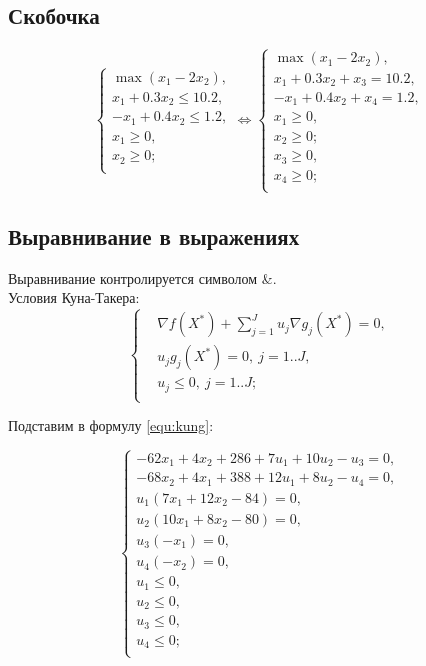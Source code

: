 \subsection{Скобочка}

\begin{equation}
	\left\{\begin{aligned}
		\max\left(x_1-2x_2\right), \\
		x_1+0.3x_2\leq 10.2, \\
		-x_1+0.4x_2\leq 1.2, \\
		x_1\geq 0, \\
		x_2\geq 0; \\
	\end{aligned}\right. \Longleftrightarrow
	\left\{\begin{aligned}
		\max\left(x_1-2x_2\right), \\
		x_1+0.3x_2+x_3=10.2, \\
		-x_1+0.4x_2+x_4=1.2, \\
		x_1\geq 0, \\
		x_2\geq 0; \\
		x_3\geq 0, \\
		x_4\geq 0; \\
	\end{aligned}\right.
\end{equation}

\subsection{Выравнивание в выражениях}

Выравнивание контролируется символом \&. \\

Условия Куна-Такера:
\begin{equation}
	\left\{\begin{aligned}
		&\nabla f(X^*)+\sum_{j=1}^{J} u_j \nabla g_j(X^*)=0,\\
		&u_j g_j(X^*)=0,~ j=1..J,\\
		&u_j \leq 0,~ j=1..J;\\
	\end{aligned}\right.
	\label{equ:kung}
\end{equation}

Подставим в формулу \vref{equ:kung}:

\begin{equation}
	\left\{\begin{aligned}
		-62x_1+4x_2+286+7u_1+10u_2-u_3=0,\\
		-68x_2+4x_1+388+12u_1+8u_2-u_4=0,\\
		u_1(7x_1+12x_2-84)=0,\\
		u_2(10x_1+8x_2-80)=0,\\
		u_3(-x_1)=0,\\
		u_4(-x_2)=0,\\
		u_1\leq 0,\\
		u_2\leq 0,\\
		u_3\leq 0,\\
		u_4\leq 0;\\
	\end{aligned}\right.
\end{equation}

